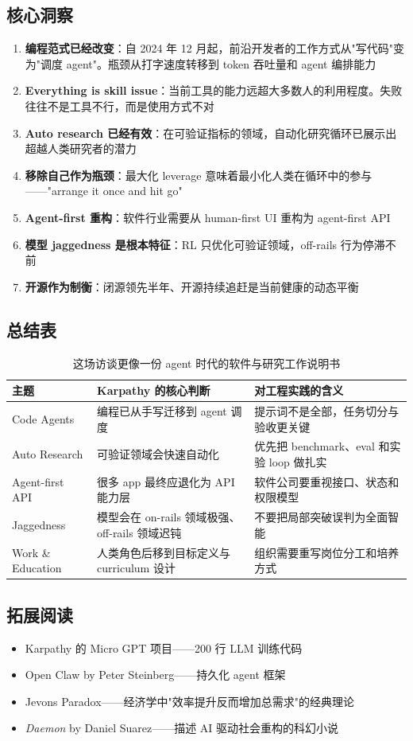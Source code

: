 \documentclass[a4paper]{article}
\begin{document}
\subsection{核心洞察}

\begin{enumerate}
    \item \textbf{编程范式已经改变}：自 2024 年 12 月起，前沿开发者的工作方式从"写代码"变为"调度 agent"。瓶颈从打字速度转移到 token 吞吐量和 agent 编排能力
    \item \textbf{Everything is skill issue}：当前工具的能力远超大多数人的利用程度。失败往往不是工具不行，而是使用方式不对
    \item \textbf{Auto research 已经有效}：在可验证指标的领域，自动化研究循环已展示出超越人类研究者的潜力
    \item \textbf{移除自己作为瓶颈}：最大化 leverage 意味着最小化人类在循环中的参与——"arrange it once and hit go"
    \item \textbf{Agent-first 重构}：软件行业需要从 human-first UI 重构为 agent-first API
    \item \textbf{模型 jaggedness 是根本特征}：RL 只优化可验证领域，off-rails 行为停滞不前
    \item \textbf{开源作为制衡}：闭源领先半年、开源持续追赶是当前健康的动态平衡
\end{enumerate}

\subsection{总结表}

\begin{table}[H]
\centering
\begin{tabular}{p{3.0cm}p{4.5cm}p{4.4cm}}
\toprule
\textbf{主题} & \textbf{Karpathy 的核心判断} & \textbf{对工程实践的含义} \\
\midrule
Code Agents & 编程已从手写迁移到 agent 调度 & 提示词不是全部，任务切分与验收更关键 \\
Auto Research & 可验证领域会快速自动化 & 优先把 benchmark、eval 和实验 loop 做扎实 \\
Agent-first API & 很多 app 最终应退化为 API 能力层 & 软件公司要重视接口、状态和权限模型 \\
Jaggedness & 模型会在 on-rails 领域极强、off-rails 领域迟钝 & 不要把局部突破误判为全面智能 \\
Work \& Education & 人类角色后移到目标定义与 curriculum 设计 & 组织需要重写岗位分工和培养方式 \\
\bottomrule
\end{tabular}
\caption{这场访谈更像一份 agent 时代的软件与研究工作说明书}
\end{table}

\subsection{拓展阅读}

\begin{itemize}
    \item Karpathy 的 Micro GPT 项目——200 行 LLM 训练代码
    \item Open Claw by Peter Steinberg——持久化 agent 框架
    \item Jevons Paradox——经济学中"效率提升反而增加总需求"的经典理论
    \item \textit{Daemon} by Daniel Suarez——描述 AI 驱动社会重构的科幻小说
\end{itemize}

\end{document}
